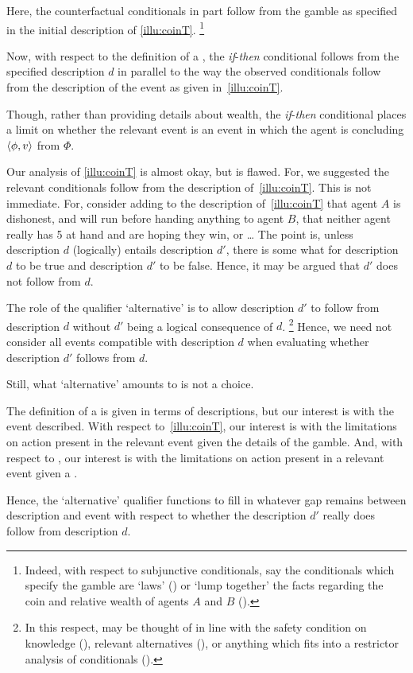 \begin{note}
  Here, the counterfactual conditionals in part follow from the gamble as specified in the initial description of \autoref{illu:coinT}.%
  \footnote{%
    \nocite{Tichy:1976tp}%
    Indeed, with respect to subjunctive conditionals, say the conditionals which specify the gamble are `laws' (\cite{Chisholm:1955aa,Lewis:1979vm,Veltman:2005tj}) or `lump together' the facts regarding the coin and relative wealth of agents \(A\) and \(B\) (\cite{Kratzer:1981aa,Kratzer:1989aa}).
  }

  Now, with respect to the definition of a \requ{}, the \emph{if}-\emph{then} conditional follows from the specified description \(d\) in parallel to the way the observed conditionals follow from the description of the event as given in~\autoref{illu:coinT}.

  Though, rather than providing details about wealth, the \emph{if}-\emph{then} conditional places a limit on whether the relevant event is an event in which the agent is concluding \(\langle \phi, v \rangle\) from \(\Phi\).
\end{note}

\begin{note}
  Our analysis of \autoref{illu:coinT} is almost okay, but is flawed.
  For, we suggested the relevant conditionals follow from the description of~\autoref{illu:coinT}.
  This is not immediate.
  For, consider adding to the description of~\autoref{illu:coinT} that agent \(A\) is dishonest, and will run before handing anything to agent \(B\), that neither agent really has \texteuro{}5 at hand and are hoping they win, or \dots
  The point is, unless description \(d\) (logically) entails description \(d'\), there is some what for description \(d\) to be true and description \(d'\) to be false.
  Hence, it may be argued that \(d'\) does not follow from \(d\).

  The role of the qualifier `alternative' is to allow description \(d'\) to follow from description \(d\) without \(d'\) being a logical consequence of \(d\).%
  \footnote{
    In this respect,  may be thought of in line with the safety condition on knowledge (\cite{Sosa:1999aa}), relevant alternatives (\cite{Dretske:1970to}), or anything which fits into a restrictor analysis of conditionals (\cite{Lewis:1975aa,Partee:1991aa}).
  }
  Hence, we need not consider all events compatible with description \(d\) when evaluating whether description \(d'\) follows from \(d\).

  Still, what `alternative' amounts to is not a choice.

  The definition of a \requ{} is given in terms of descriptions, but our interest is with the event described.
  With respect to~\autoref{illu:coinT}, our interest is with the limitations on action present in the relevant event given the details of the gamble.
  And, with respect to , our interest is with the limitations on action present in a relevant event given a \requ{}.

  Hence, the `alternative' qualifier functions to fill in whatever gap remains between description and event with respect to whether the description \(d'\) really does follow from description \(d\).
\end{note}

